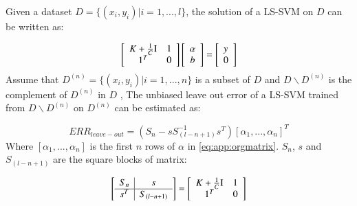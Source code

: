 \begin{theorem}
	Given a dataset $D=\{(x_i,y_i)|i=1,...,l\}$, the solution of a LS-SVM on $D$ can be written as:
	
	\begin{equation}\label{eq:app:orgmatrix}
	\left[ {\begin{array}{*{20}{c}}
		{K  + \frac{1}{C}{\rm I}}\\
		1^T
		\end{array}\begin{array}{*{20}{c}}
		1\\
		0
		\end{array}} \right]\left[ {\begin{array}{*{20}{c}}
		\alpha \\
		b
		\end{array}} \right] = \left[ \begin{array}{l}
	y\\
	0
	\end{array} \right]
	\end{equation}
	Assume that $D^{(n)} = \{(x_i,y_i)|i=1,...,n\}$ is a subset of $D$ and $D\backslash D^{(n)}$ is the complement of $D^{(n)}$ in $D$ , The unbiased leave out error of a LS-SVM trained from $D\backslash D^{(n)}$ on $D^{(n)}$ can be estimated as:
	
	\begin{equation*}%
	ERR_{leave-out} = \left( {{S_n} - sS_{(l - n + 1)}^{ - 1}{s^T}} \right){\left[ {{\alpha _1},...,{\alpha _n}} \right]^T}
	\end{equation*}
	Where $\left[\alpha_1,...,\alpha_n\right]$ is the first $n$ rows of $\alpha$ in \eqref{eq:app:orgmatrix}. $S_n$, $s$ and $S_{(l - n + 1)}$ are the square blocks of matrix:
	
	\begin{equation*}
	\left[ {\begin{array}{c|c}
		{{S_{n }}} &s\\ \hline
		{{s^T}}&{{S_{(l - n + 1)}}}
		\end{array}} \right] =\left[ {\begin{array}{*{20}{c}}
		{K  + \frac{1}{C}{\rm I}}\\
		1^T
		\end{array}\begin{array}{*{20}{c}}
		1\\
		0
		\end{array}} \right]
	\end{equation*}
\end{theorem}

